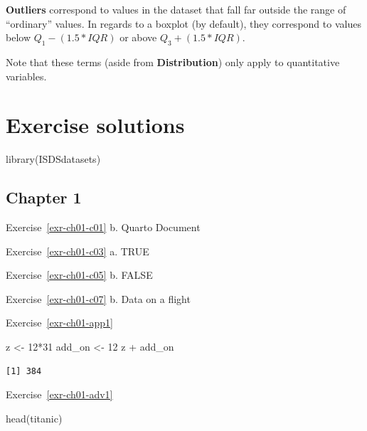 \documentclass[
  letterpaper,
  DIV=11,
  numbers=noendperiod]{scrreprt}
\newenvironment{Shaded}{\begin{snugshade}}{\end{snugshade}}
\newcommand{\DecValTok}[1]{\textcolor[rgb]{0.68,0.00,0.00}{#1}}
\newcommand{\FunctionTok}[1]{\textcolor[rgb]{0.28,0.35,0.67}{#1}}
\newcommand{\NormalTok}[1]{\textcolor[rgb]{0.00,0.23,0.31}{#1}}
\newcommand{\OtherTok}[1]{\textcolor[rgb]{0.00,0.23,0.31}{#1}}
\newcommand{\SpecialCharTok}[1]{\textcolor[rgb]{0.37,0.37,0.37}{#1}}
\theoremstyle{definition}
\theoremstyle{remark}
\begin{document}
\textbf{Outliers} correspond to values in the dataset that fall far
outside the range of ``ordinary'' values. In regards to a boxplot (by
default), they correspond to values below \(Q_1 - (1.5 * IQR)\) or above
\(Q_3 + (1.5 * IQR)\).

Note that these terms (aside from \textbf{Distribution}) only apply to
quantitative variables.

\hypertarget{sec-exr-sol}{%
\chapter{Exercise solutions}\label{sec-exr-sol}}

\begin{Shaded}
\begin{Highlighting}[]
\FunctionTok{library}\NormalTok{(ISDSdatasets)}
\end{Highlighting}
\end{Shaded}

\hypertarget{sec-ex01-sol}{%
\section{Chapter 1}\label{sec-ex01-sol}}

Exercise~\ref{exr-ch01-c01} b. Quarto Document

Exercise~\ref{exr-ch01-c03} a. TRUE

Exercise~\ref{exr-ch01-c05} b. FALSE

Exercise~\ref{exr-ch01-c07} b. Data on a flight

Exercise~\ref{exr-ch01-app1}

\begin{Shaded}
\begin{Highlighting}[]
\NormalTok{z }\OtherTok{\textless{}{-}} \DecValTok{12}\SpecialCharTok{*}\DecValTok{31}
\NormalTok{add\_on }\OtherTok{\textless{}{-}} \DecValTok{12}
\NormalTok{z }\SpecialCharTok{+}\NormalTok{ add\_on}
\end{Highlighting}
\end{Shaded}

\begin{verbatim}
[1] 384
\end{verbatim}

Exercise~\ref{exr-ch01-adv1}

\begin{Shaded}
\begin{Highlighting}[]
\FunctionTok{head}\NormalTok{(titanic)}
\end{Highlighting}
\end{Shaded}
\end{document}
